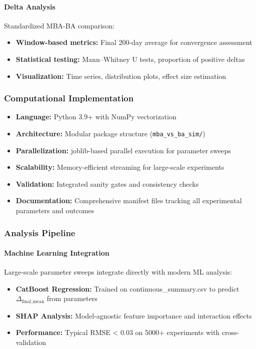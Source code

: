 \documentclass[aps,pre,twocolumn,floatfix,nofootinbib,amsmath,amssymb]{revtex4-2}
\begin{document}
\paragraph{Delta Analysis}
Standardized MBA-BA comparison:
\begin{itemize}
\item \textbf{Window-based metrics:} Final 200-day average for convergence assessment
\item \textbf{Statistical testing:} Mann--Whitney U tests, proportion of positive deltas
\item \textbf{Visualization:} Time series, distribution plots, effect size estimation
\end{itemize}

\subsubsection{Computational Implementation}

\begin{itemize}
\item \textbf{Language:} Python 3.9+ with NumPy vectorization
\item \textbf{Architecture:} Modular package structure (\texttt{mba\_vs\_ba\_sim/})
\item \textbf{Parallelization:} joblib-based parallel execution for parameter sweeps
\item \textbf{Scalability:} Memory-efficient streaming for large-scale experiments
\item \textbf{Validation:} Integrated sanity gates and consistency checks
\item \textbf{Documentation:} Comprehensive manifest files tracking all experimental parameters and outcomes
\end{itemize}

\subsubsection{Analysis Pipeline}

\paragraph{Machine Learning Integration}
Large-scale parameter sweeps integrate directly with modern ML analysis:

\begin{itemize}
\item \textbf{CatBoost Regression:} Trained on continuous\_summary.csv to predict $\Delta_{\text{final\_mean}}$ from parameters
\item \textbf{SHAP Analysis:} Model-agnostic feature importance and interaction effects
\item \textbf{Performance:} Typical RMSE < 0.03 on 5000+ experiments with cross-validation
\end{itemize}
\end{document}
